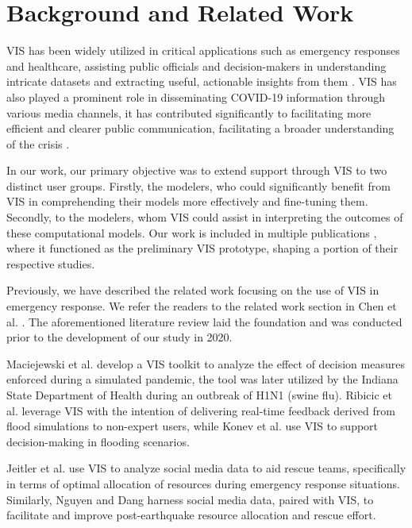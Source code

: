 \section{Background and Related Work}

\ac{VIS} has been widely utilized in critical applications such as emergency responses and healthcare, assisting public officials and decision-makers in understanding intricate datasets and extracting useful, actionable insights from them \cite{dusse2016Information}. 
\ac{VIS} has also played a prominent role in disseminating COVID-19 information through various media channels, it has contributed significantly to facilitating more efficient and clearer public communication, facilitating a broader understanding of the crisis \cite{johnshopkinsuniversityCOVID19}.

In our work, our primary objective was to extend support through \ac{VIS} to two distinct user groups.
Firstly, the modelers, who could significantly benefit from VIS in comprehending their models more effectively and fine-tuning them.
Secondly, to the modelers, whom VIS could assist in interpreting the outcomes of these computational models. Our work is included in multiple publications \cite{chen2022RAMPVIS,dykes2022Visualizationb,khan2022Propagating,khan2022Rapid,rydow2023RAMPVIS}, where it functioned as the preliminary VIS prototype, shaping a portion of their respective studies.


Previously, we have described the related work focusing on the use of \ac{VIS} in emergency response. We refer the readers to the related work section in Chen et al. \cite{chen2022RAMPVIS}. The aforementioned literature review laid the foundation and was conducted prior to the development of our study in 2020.

Maciejewski et al. \cite{maciejewski2011Pandemica} develop a VIS toolkit to analyze the effect of decision measures enforced during a simulated pandemic, the tool was later utilized by the Indiana State Department of Health during an outbreak of H1N1 (swine flu).
Ribicic et al. \cite{ribicic2012Sketching} leverage VIS with the intention of delivering real-time feedback derived from flood simulations to non-expert users, while Konev et al. \cite{konev2014Run} use VIS to support decision-making in flooding scenarios.

Jeitler et al. \cite{jeitler2019RescueMark} use VIS to analyze social media data to aid rescue teams, specifically in terms of optimal allocation of resources during emergency response situations.
Similarly, Nguyen and Dang \cite{nguyen2019EQSA} harness social media data, paired with VIS, to facilitate and improve post-earthquake resource allocation and rescue effort.


